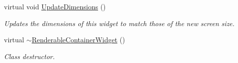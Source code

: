 \begin{DoxyCompactItemize}
virtual void \hyperlink{classMezzanine_1_1UI_1_1RenderableContainerWidget_acfea936d03f85a2e6d289e50844d6b11}{UpdateDimensions} ()
\begin{DoxyCompactList}\small\item\em Updates the dimensions of this widget to match those of the new screen size. \item\end{DoxyCompactList}\item 
\hypertarget{classMezzanine_1_1UI_1_1RenderableContainerWidget_aa714e0983c31452f7f9aebf7932262cb}{
virtual \hyperlink{classMezzanine_1_1UI_1_1RenderableContainerWidget_aa714e0983c31452f7f9aebf7932262cb}{$\sim$RenderableContainerWidget} ()}
\label{classMezzanine_1_1UI_1_1RenderableContainerWidget_aa714e0983c31452f7f9aebf7932262cb}

\begin{DoxyCompactList}\small\item\em Class destructor. \item\end{DoxyCompactList}\end{DoxyCompactItemize}
